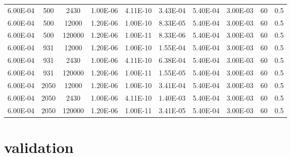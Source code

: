 \documentclass[../thesis.tex]{subfiles}
\begin{document}
\begin{landscape}
\begin{table}[htb]
\begin{tabular}{cccccccccc}
			6.00E-04            & 500         & 2430        & 1.00E-06               & 4.11E-10               & 3.43E-04              & 5.40E-04      & 3.00E-03        & 60                            & 0.5                       \\
			6.00E-04            & 500         & 12000       & 1.20E-06               & 1.00E-10               & 8.33E-05              & 5.40E-04      & 3.00E-03        & 60                            & 0.5                       \\
			6.00E-04            & 500         & 120000      & 1.20E-06               & 1.00E-11               & 8.33E-06              & 5.40E-04      & 3.00E-03        & 60                            & 0.5                       \\
			6.00E-04            & 931         & 12000       & 1.20E-06               & 1.00E-10               & 1.55E-04              & 5.40E-04      & 3.00E-03        & 60                            & 0.5                       \\
			6.00E-04            & 931         & 2430        & 1.00E-06               & 4.11E-10               & 6.38E-04              & 5.40E-04      & 3.00E-03        & 60                            & 0.5                       \\
			6.00E-04            & 931         & 120000      & 1.20E-06               & 1.00E-11               & 1.55E-05              & 5.40E-04      & 3.00E-03        & 60                            & 0.5                       \\
			6.00E-04            & 2050        & 12000       & 1.20E-06               & 1.00E-10               & 3.41E-04              & 5.40E-04      & 3.00E-03        & 60                            & 0.5                       \\
			6.00E-04            & 2050        & 2430        & 1.00E-06               & 4.11E-10               & 1.40E-03              & 5.40E-04      & 3.00E-03        & 60                            & 0.5                       \\
			6.00E-04            & 2050        & 120000      & 1.20E-06               & 1.00E-11               & 3.41E-05              & 5.40E-04      & 3.00E-03        & 60                            & 0.5						\\
			\hline      
		\end{tabular}
	\end{table}
\end{landscape}

\section{validation}
\label{chp:validation}
\end{document}
